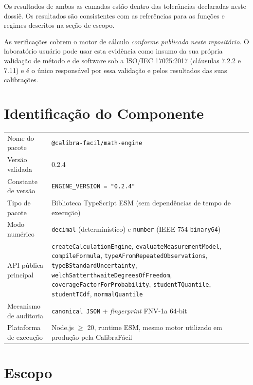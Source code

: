 \documentclass[11pt,a4paper]{article}
\newcommand{\docVersion}{0.2.4}
\begin{document}
Os resultados de ambas as camadas estão dentro das tolerâncias declaradas neste dossiê. Os resultados são consistentes com as referências para as funções e regimes descritos na seção de escopo.

As verificações cobrem o motor de cálculo \emph{conforme publicado neste repositório}. O laboratório usuário pode usar esta evidência como insumo da sua própria validação de método e de software sob a ISO/IEC 17025:2017 (cláusulas 7.2.2 e 7.11) e é o único responsável por essa validação e pelos resultados das suas calibrações.

\section{Identificação do Componente}

\begin{tabularx}{\textwidth}{l X}
  \toprule
  Nome do pacote          & \texttt{@calibra-facil/math-engine} \\
  Versão validada         & \docVersion \\
  Constante de versão     & \texttt{ENGINE\_VERSION = "\docVersion"} \\
  Tipo de pacote          & Biblioteca TypeScript ESM (sem dependências de tempo de execução) \\
  Modo numérico           & \texttt{decimal} (determinístico) e \texttt{number} (IEEE-754 \texttt{binary64}) \\
  API pública principal   & \texttt{createCalculationEngine}, \texttt{evaluateMeasurementModel}, \texttt{compileFormula}, \texttt{typeAFromRepeatedObservations}, \texttt{typeBStandardUncertainty}, \texttt{welchSatterthwaiteDegreesOfFreedom}, \texttt{coverageFactorForProbability}, \texttt{studentTQuantile}, \texttt{studentTCdf}, \texttt{normalQuantile} \\
  Mecanismo de auditoria  & \texttt{canonical JSON} + \emph{fingerprint} FNV-1a 64-bit \\
  Plataforma de execução  & Node.js \(\geq\) 20, runtime ESM, mesmo motor utilizado em produção pela CalibraFácil \\
  \bottomrule
\end{tabularx}

\section{Escopo}
\label{sec:escopo}
\end{document}
